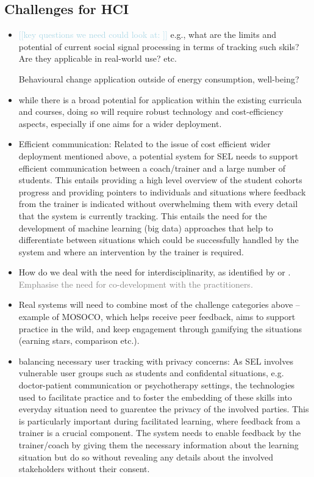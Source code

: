 \documentclass[prodmode,acmtochi]{acmsmall}
\newcommand{\todo}[1]{\textrm{\textrm{\textcolor{LightBlue}{[[#1]]}}}}
\newcommand{\rephrase}[1]{\textrm{\textrm{\textcolor{gray}{#1}}}}
\begin{document}
\subsection{Challenges for HCI }
        \begin{itemize}
                \item \todo{key questions we need could look at: } e.g., what are the limits and potential of current social signal processing in terms of tracking such skils? Are they applicable in real-world use? etc. 

                Behavioural change application outside of energy consumption, well-being? 
                \item while there is a broad potential for application within the existing curricula and courses, doing so will require robust technology and cost-efficiency aspects, especially if one aims for a wider deployment.
\item Efficient communication: Related to the issue of cost efficient wider deployment mentioned above, a potential system for SEL needs to support efficient communication between a coach/trainer and a large number of students. This entails providing a high level overview of the student cohorts progress and providing pointers to individuals and situations where feedback from the trainer is indicated without overwhelming them with every detail that the system is currently tracking. This entails the need for the development of machine learning (big data) approaches that help to differentiate between situations which could be successfully handled by the system and where an intervention by the trainer is required.   
                \item How do we deal with the need for interdisciplinarity, as identified by  or . \rephrase{Emphasise the need for co-development with the practitioners. }
                \item Real systems will need to combine most of the challenge categories above -- example of MOSOCO, which helps receive peer feedback, aims to support practice in the wild, and keep engagement through gamifying the situations (earning stars, comparison etc.). 
\item balancing necessary user tracking with privacy concerns:  As SEL involves vulnerable user groups such as students and confidental situations, e.g. doctor-patient communication or psychotherapy settings, the technologies used to facilitate practice and to foster the embedding of these skills into everyday situation need to guarentee the privacy of the involved parties. This is particularly important during facilitated learning, where feedback from a trainer is a crucial component. The system needs to enable feedback by the trainer/coach by giving them the necessary information about the learning situation but do so without revealing any details about the involved stakeholders without their consent. 

        \end{itemize}
\end{document}
